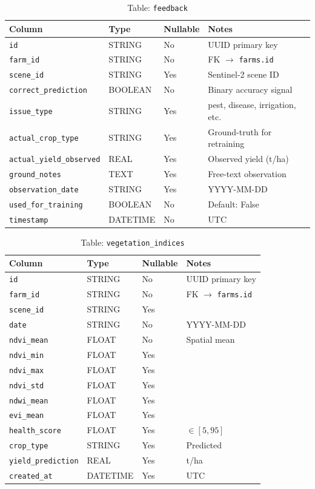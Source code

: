\documentclass[12pt,a4paper,oneside]{report}
\begin{document}
\begin{table}[h]\centering\caption{Table: \texttt{feedback}}
\begin{tabular}{llll}\toprule\textbf{Column}&\textbf{Type}&\textbf{Nullable}&\textbf{Notes}\\\midrule
\texttt{id}                     &STRING  &No &UUID primary key\\
\texttt{farm\_id}               &STRING  &No &FK $\to$ \texttt{farms.id}\\
\texttt{scene\_id}              &STRING  &Yes&Sentinel-2 scene ID\\
\texttt{correct\_prediction}    &BOOLEAN &No &Binary accuracy signal\\
\texttt{issue\_type}            &STRING  &Yes&pest, disease, irrigation, etc.\\
\texttt{actual\_crop\_type}     &STRING  &Yes&Ground-truth for retraining\\
\texttt{actual\_yield\_observed}&REAL    &Yes&Observed yield (t/ha)\\
\texttt{ground\_notes}          &TEXT    &Yes&Free-text observation\\
\texttt{observation\_date}      &STRING  &Yes&YYYY-MM-DD\\
\texttt{used\_for\_training}    &BOOLEAN &No &Default: False\\
\texttt{timestamp}              &DATETIME&No &UTC\\\bottomrule\end{tabular}\end{table}

\begin{table}[h]\centering\caption{Table: \texttt{vegetation\_indices}}
\begin{tabular}{llll}\toprule\textbf{Column}&\textbf{Type}&\textbf{Nullable}&\textbf{Notes}\\\midrule
\texttt{id}              &STRING  &No &UUID primary key\\
\texttt{farm\_id}        &STRING  &No &FK $\to$ \texttt{farms.id}\\
\texttt{scene\_id}       &STRING  &Yes&\\
\texttt{date}            &STRING  &No &YYYY-MM-DD\\
\texttt{ndvi\_mean}      &FLOAT   &No &Spatial mean\\
\texttt{ndvi\_min}       &FLOAT   &Yes&\\
\texttt{ndvi\_max}       &FLOAT   &Yes&\\
\texttt{ndvi\_std}       &FLOAT   &Yes&\\
\texttt{ndwi\_mean}      &FLOAT   &Yes&\\
\texttt{evi\_mean}       &FLOAT   &Yes&\\
\texttt{health\_score}   &FLOAT   &Yes&$\in [5, 95]$\\
\texttt{crop\_type}      &STRING  &Yes&Predicted\\
\texttt{yield\_prediction}&REAL   &Yes&t/ha\\
\texttt{created\_at}     &DATETIME&Yes&UTC\\\bottomrule\end{tabular}\end{table}
\end{document}
